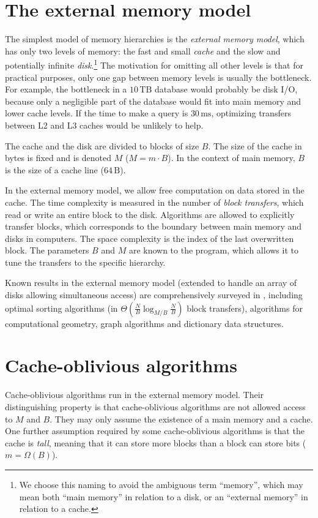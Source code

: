 \section{The external memory model}
The simplest model of memory hierarchies is the \emph{external memory model},
which has only two levels of memory: the fast and small \emph{cache} and the
slow and potentially infinite \emph{disk}.\footnote{%
	We choose this naming to avoid the ambiguous term ``memory'',
	which may mean both ``main memory'' in relation to a disk,
	or an ``external memory'' in relation to a cache.
} The motivation for omitting all other levels is that for practical purposes,
only one gap between memory levels is usually the bottleneck. For example,
the bottleneck in a $10\,\text{TB}$ database would probably be disk I/O,
because only a negligible part of the database would fit into main memory and
lower cache levels. If the time to make a query is $30\,\text{ms}$,
optimizing transfers between L2 and L3 caches would be unlikely to help.

The cache and the disk are divided to blocks of size $B$. The size of the cache 
in bytes is fixed and is denoted $M$ ($M=m\cdot B$).
In the context of main memory, $B$ is the size of a cache line
($64\,\text{B}$).

In the external memory model, we allow free computation on data
stored in the cache. The time complexity is measured in the number of
\emph{block transfers}, which read or write an entire block to the disk.
Algorithms are allowed to explicitly transfer blocks, which corresponds
to the boundary between main memory and disks in computers.
The space complexity is the index of the last overwritten block.
The parameters $B$ and $M$ are known to the program, which allows it to tune
the transfers to the specific hierarchy.

Known results in the external memory model (extended to handle an array
of disks allowing simultaneous access) are comprehensively surveyed in
\cite{em-ads}, including optimal sorting algorithms
(in $\Theta(\frac{N}{B}\log_{M/B}\frac{N}{B})$ block transfers),
algorithms for computational geometry, graph algorithms and dictionary
data structures.

\section{Cache-oblivious algorithms}
Cache-oblivious algorithms run in the external memory model.
Their distinguishing property is that cache-oblivious algorithms
are not allowed access to $M$ and $B$. They may only assume the existence
of a main memory and a cache.
One further assumption required by some cache-oblivious algorithms is
that the cache is \emph{tall}, meaning that it can store more blocks
than a block can store bits ($m=\Omega(B)$).

